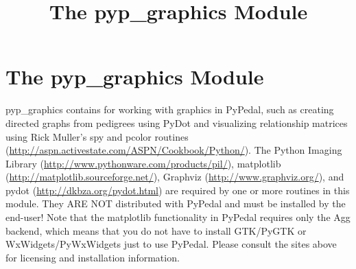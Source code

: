 \documentclass[10pt]{article}
\title{The pyp\_graphics Module}
\begin{document}
\section*{The pyp\_graphics Module}


 pyp\_graphics contains for working with graphics in PyPedal, such as creating directed graphs from pedigrees using PyDot and visualizing relationship matrices using Rick Muller's spy and pcolor routines (\url{http://aspn.activestate.com/ASPN/Cookbook/Python/}). The Python Imaging Library (\url{http://www.pythonware.com/products/pil/}), matplotlib (\url{http://matplotlib.sourceforge.net/}), Graphviz (\url{http://www.graphviz.org/}), and pydot (\url{http://dkbza.org/pydot.html}) are required by one or more routines in this module. They ARE NOT distributed with PyPedal and must be installed by the end-user! Note that the matplotlib functionality in PyPedal requires only the Agg backend, which means that you do not have to install GTK/PyGTK or WxWidgets/PyWxWidgets just to use PyPedal. Please consult the sites above for licensing and installation information.
\end{document}
